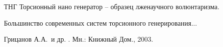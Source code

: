 \documentclass[utf8,usehyperref,12pt]{G7-32}
\begin{document}
\NormRefs %
\Defines %


\Abbreviations %
\begin{abbreviation}
\item[ТНГ] Торсионный нано генератор -- образец лженаучного волюнтаризма.
\end{abbreviation}

\Introduction
Большинство современных систем торсионного\cite{filosofyNewestdict} генерирования...

\backmatter %

\Conclusion %

\begin{thebibliography}{1} %

{Грицанов} А.А.~и др.
.
\newblock Мн.: Книжный Дом., 2003.

\end{thebibliography}

\end{document}

